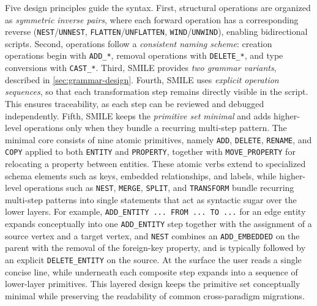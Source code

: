 Five design principles guide the syntax. First, structural operations are
  organized as \emph{symmetric inverse pairs}, where each forward operation
  has a corresponding reverse (\texttt{NEST}/\texttt{UNNEST},
  \texttt{FLATTEN}/\texttt{UNFLATTEN}, \texttt{WIND}/\texttt{UNWIND}),
  enabling bidirectional scripts. Second, operations follow a
  \emph{consistent naming scheme}: creation operations begin with
  \texttt{ADD\_*}, removal operations with \texttt{DELETE\_*}, and type
  conversions with \texttt{CAST\_*}. Third, SMILE provides
  \emph{two grammar variants}, described in \autoref{sec:grammar-design}.
  Fourth, SMILE uses \emph{explicit operation sequences}, so that each
  transformation step remains directly visible in the script. This ensures
  traceability, as each step can be reviewed and debugged independently.
 Fifth, SMILE keeps the \emph{primitive set minimal} and adds higher-level operations only when
  they bundle a recurring multi-step pattern. The minimal core consists of nine atomic primitives,
  namely \texttt{ADD}, \texttt{DELETE}, \texttt{RENAME}, and \texttt{COPY} applied to both
  \texttt{ENTITY} and \texttt{PROPERTY}, together with \texttt{MOVE\_PROPERTY} for relocating a
  property between entities. These atomic
  verbs extend to specialized schema elements such as keys, embedded relationships, and labels,
  while higher-level operations such as \texttt{NEST}, \texttt{MERGE}, \texttt{SPLIT}, and
  \texttt{TRANSFORM} bundle recurring multi-step patterns into single statements that act as
  syntactic sugar over the lower layers. For example, \texttt{ADD\_ENTITY ... FROM ... TO ...}
  for an edge entity expands conceptually into one \texttt{ADD\_ENTITY} step together with the
  assignment of a source vertex and a target vertex, and \texttt{NEST} combines an
  \texttt{ADD\_EMBEDDED} on the parent with the removal of the foreign-key property, and is
  typically followed by an explicit \texttt{DELETE\_ENTITY} on the source. At the surface the user reads a single concise line, while underneath each composite step expands into a sequence of lower-layer primitives. This layered design keeps the primitive set conceptually minimal while
  preserving the readability of common cross-paradigm migrations.



